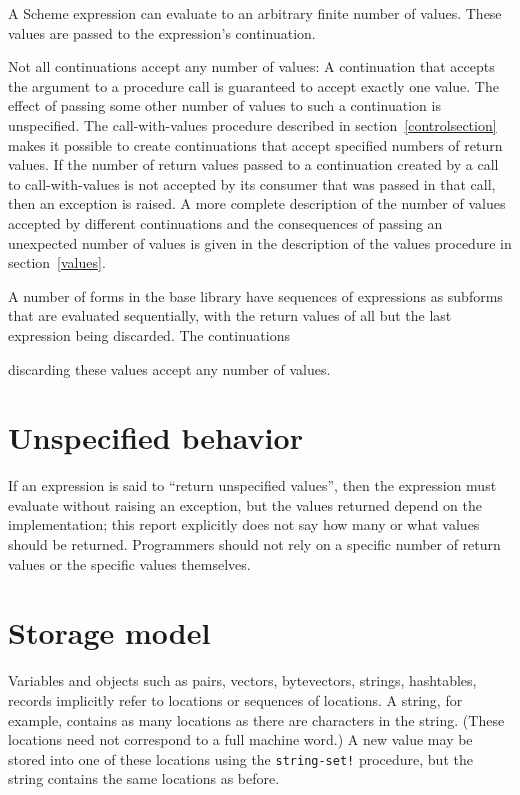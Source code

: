 A Scheme expression can evaluate to an arbitrary finite number of
values.  These values are passed to the expression's continuation.

Not all continuations accept any number of values: A continuation that
accepts the argument to a procedure call is guaranteed to accept
exactly one value.  The effect of passing some other number of values
to such a continuation is unspecified.  The {\cf call-with-values}
procedure
described in section~\ref{controlsection} makes it possible to create
continuations that accept specified numbers of return values.
If the number of
return values passed to a continuation created by a call to
{\cf call-with-values} is not accepted by its consumer
that was passed in that call, then an exception is raised.
A more complete description of the number of values accepted by
different continuations and the consequences of passing an unexpected
number of values is given in the description of the {\cf values}
procedure in section~\ref{values}.

A number of forms in the base library have sequences of expressions
as subforms that are evaluated sequentially, with the return values of
all but the last expression being discarded.  The continuations

discarding these values accept any number of values.

\section{Unspecified behavior}

\vest If an expression is said to ``return unspecified values'',
then the expression must evaluate without raising an exception, but
the values returned depend on the implementation; this report
explicitly does not say how many or what values should be returned.
Programmers should not rely on a specific number of return values or
the specific values themselves.


\section{Storage model}
\label{storagemodel}

Variables and objects such as pairs, vectors, bytevectors, strings, hashtables, records implicitly
refer to locations or sequences of locations.  A string, for
example, contains as many locations as there are characters in the string. 
(These locations need not correspond to a full machine word.) A new value may be
stored into one of these locations using the {\tt string-set!} procedure, but
the string contains the same locations as before.

